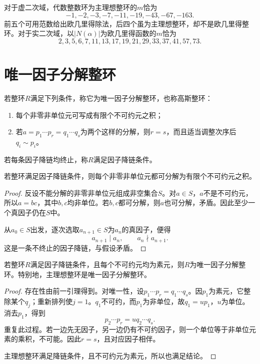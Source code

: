 对于虚二次域，代数整数环为主理想整环的$m$恰为
\[
-1,-2,-3,-7,-11,-19,-43,-67,-163.
\]
前五个可用范数给出欧几里得除法，后四个虽为主理想整环，却不是欧几里得整环。对于实二次域，以$|N(\alpha)|$为欧几里得函数的$m$恰为
\[
2,3,5,6,7,11,13,17,19,21,29,33,37,41,57,73.
\]


\section{唯一因子分解整环}

\begin{definition}
若整环$R$满足下列条件，称它为唯一因子分解整环，也称高斯整环：
\begin{enumerate}
\item 每个非零非单位元可写成有限个不可约元之积；
\item 若$a=p_1\cdots p_r=q_1\cdots q_s$为两个这样的分解，则$r=s$，而且适当调整次序后$q_i\sim p_i$。
\end{enumerate}
若每条因子降链均终止，称$R$满足因子降链条件。
\end{definition}

\begin{lemma}\label{p2:acc-factorization}
若整环满足因子降链条件，则每个非零非单位元都可分解为有限个不可约元之积。
\end{lemma}
\begin{proof}
反设不能分解的非零非单位元组成非空集合$S$。对$a\in S$，$a$不是不可约元，所以$a=bc$，其中$b,c$均非单位。若$b,c$都可分解，则$a$也可分解，矛盾。因此至少一个真因子仍在$S$中。

从$a_0\in S$出发，逐次选取$a_{n+1}\in S$为$a_n$的真因子，便得
\[
a_{n+1}\mid a_n,\qquad a_n\nmid a_{n+1}.
\]
这是一条不终止的因子降链，与假设矛盾。
\end{proof}

\begin{theorem}\label{p2:ufd-criterion}
若整环$R$满足因子降链条件，且每个不可约元均为素元，则$R$为唯一因子分解整环。特别地，主理想整环是唯一因子分解整环。
\end{theorem}
\begin{proof}
存在性由前一引理得到。对唯一性，设$p_1\cdots p_r=q_1\cdots q_s$。因$p_1$为素元，它整除某个$q_j$；重新排列使$j=1$。$q_1$不可约，而$p_1$为非单位，故$q_1=u p_1$，$u$为单位。消去$p_1$，得到
\[
p_2\cdots p_r=u q_2\cdots q_s.
\]
重复此过程。若一边先无因子，另一边仍有不可约因子，则一个单位等于非单位元素的乘积，不可能。因此$r=s$，且对应因子相伴。

主理想整环满足降链条件，且不可约元为素元，所以也满足结论。
\end{proof}


